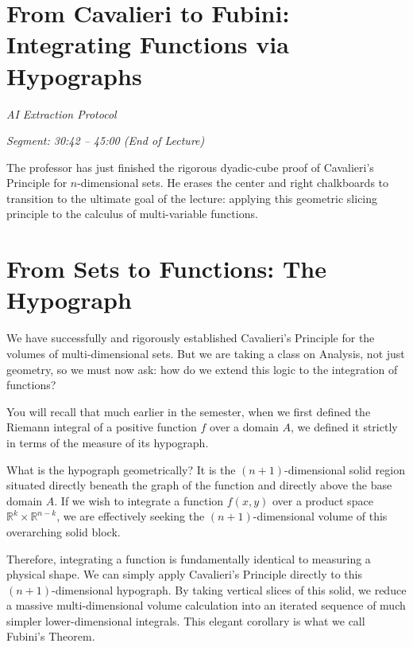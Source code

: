 
\section{From Cavalieri to Fubini: Integrating Functions via Hypographs}

\emph{AI Extraction Protocol}

\textit{Segment: 30:42 -- 45:00 (End of Lecture)}

\begin{meta-note}
The professor has just finished the rigorous dyadic-cube proof of Cavalieri's Principle for $n$-dimensional sets. He erases the center and right chalkboards to transition to the ultimate goal of the lecture: applying this geometric slicing principle to the calculus of multi-variable functions. 
\end{meta-note}

\section{From Sets to Functions: The Hypograph}

\begin{spoken-clean}[30:42 - 34:15]
We have successfully and rigorously established Cavalieri's Principle for the volumes of multi-dimensional sets. But we are taking a class on Analysis, not just geometry, so we must now ask: how do we extend this logic to the integration of functions? 

You will recall that much earlier in the semester, when we first defined the Riemann integral of a positive function $f$ over a domain $A$, we defined it strictly in terms of the measure of its hypograph. 

What is the hypograph geometrically? It is the $(n+1)$-dimensional solid region situated directly beneath the graph of the function and directly above the base domain $A$. If we wish to integrate a function $f(x,y)$ over a product space $\mathbb{R}^k \times \mathbb{R}^{n-k}$, we are effectively seeking the $(n+1)$-dimensional volume of this overarching solid block. 

Therefore, integrating a function is fundamentally identical to measuring a physical shape. We can simply apply Cavalieri's Principle directly to this $(n+1)$-dimensional hypograph. By taking vertical slices of this solid, we reduce a massive multi-dimensional volume calculation into an iterated sequence of much simpler lower-dimensional integrals. This elegant corollary is what we call Fubini's Theorem.
\end{spoken-clean}

